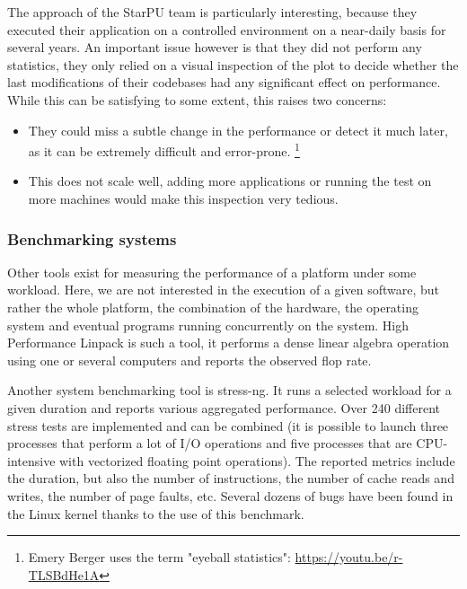                 The approach of the StarPU team is particularly interesting, because they executed their application on
                a controlled environment on a near-daily basis for several years. An important issue however is that they
                did not perform any statistics, they only relied on a visual inspection of the plot to decide whether
                the last modifications of their codebases had any significant effect on performance. While this can be
                satisfying to some extent, this raises two concerns:
                \begin{itemize}
                    \item They could miss a subtle change in the performance or detect it much later, as it can be
                        extremely difficult and error-prone. \footnote{Emery Berger uses the term "eyeball statistics":
                        \url{https://youtu.be/r-TLSBdHe1A}}
                    \item This does not scale well, adding more applications or running the test on more machines would
                        make this inspection very tedious.
                \end{itemize}

            \subsubsection{Benchmarking systems}%

                Other tools exist for measuring the performance of a platform under some workload. Here, we are not
                interested in the execution of a given software, but rather the whole platform, \ie the combination of
                the hardware, the operating system and eventual programs running concurrently on the system.
                High Performance Linpack \cite{hpl} is such a tool, it performs a dense linear algebra operation using
                one or several computers and reports the observed flop rate.

                Another system benchmarking tool is stress-ng\cite{stress-ng}. It runs a selected workload for a given
                duration and reports various aggregated performance. Over 240 different stress tests are implemented and
                can be combined (\eg it is possible to launch three processes that perform a lot of I/O operations and
                five processes that are CPU-intensive with vectorized floating point operations). The reported metrics
                include the duration, but also the number of instructions, the number of cache reads and writes, the
                number of page faults, etc. Several dozens of bugs have been found in the Linux kernel thanks to the use
                of this benchmark.

